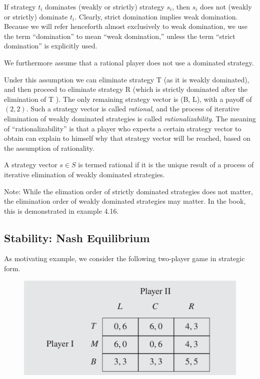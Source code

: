 If strategy $t_i$ dominates (weakly or strictly) strategy $s_i$, then $s_i$ does not (weakly or strictly) dominate $t_i$. Clearly, strict domination implies weak domination. Because we will refer henceforth almost exclusively to weak domination, we use the term “domination” to mean “weak domination,” unless the term “strict domination” is explicitly used.

We furthermore assume that a rational player does not use a dominated strategy.

Under this assumption we can eliminate strategy T (as it is weakly dominated), and then proceed to eliminate strategy R (which
is strictly dominated after the elimination of T ). The only remaining strategy vector is (B, L), with a payoff of $(2, 2)$. Such a strategy vector is called \emph{rational}, and the process of iterative elimination of weakly dominated strategies is called \emph{rationalizability}. The meaning of “rationalizability” is that a player who expects a certain strategy vector to obtain can explain to himself why that strategy vector will be reached, based on the assumption of rationality.

\begin{definition}
A strategy vector $s \in S$ is termed rational if it is the unique result of a process of iterative elimination of weakly dominated strategies.
\end{definition}

Note: While the elimation order of strictly dominated strategies does not matter, the elimination order of weakly dominated strategies may matter. In the book, this is demonstrated in example 4.16.

\subsection{Stability: Nash Equilibrium}

As motivating example, we consider the following two-player game in strategic form.

\begin{figure}[H]
    \centering
    \includegraphics[scale=0.75]{images/2023-10-10-game_theory_30.png}
\end{figure}


